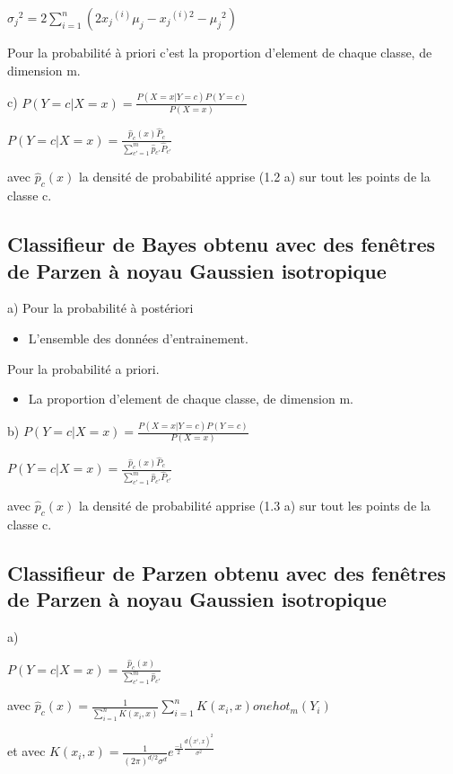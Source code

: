 \documentclass[a4paper,10pt]{article}
\begin{document}
$ {\sigma_j}^2 = 2 \sum_{i = 1}^{n}(2 {x_j}^{(i)}  \mu_j - {x_j}^{(i)2} - {\mu_j}^2)$

Pour la probabilité à priori c'est la proportion d'element de chaque classe, de dimension m.

c)
$P(Y=c | X=x)  = \frac{P(X=x | Y=c) P(Y=c)}{P(X=x)} $

$P(Y=c | X=x)  = \frac{ \hat{p}_{c}(x) \hat{P}_{c}}{ \sum_{c'=1}^{m} \hat{p}_{c'} \hat{P}_{c'} } $

avec $ \hat{p}_{c}(x) $ la densité de probabilité apprise (1.2 a) sur tout les points de la classe c.

\subsection{Classifieur de Bayes obtenu avec des fenêtres de Parzen à noyau Gaussien isotropique}

a) Pour la probabilité à postériori
\begin{itemize}
	\item L'ensemble des données d'entrainement.
\end{itemize}

Pour la probabilité a priori.
\begin{itemize}
	\item La proportion d'element de chaque classe, de dimension m.
\end{itemize}

b) $P(Y=c | X=x)  = \frac{P(X=x | Y=c) P(Y=c)}{P(X=x)} $

$P(Y=c | X=x)  = \frac{ \hat{p}_{c}(x) \hat{P}_{c}}{ \sum_{c'=1}^{m} \hat{p}_{c'} \hat{P}_{c'} } $

avec $ \hat{p}_{c}(x) $ la densité de probabilité apprise (1.3 a) sur tout les points de la classe c.


\subsection{Classifieur de Parzen obtenu avec des fenêtres de Parzen à noyau Gaussien isotropique}

a)

$P(Y=c | X=x)  = \frac{ \hat{p}_{c}(x) }{ \sum_{c'=1}^{m} \hat{p}_{c'} } $

avec $ \hat{p}_{c}(x) =  \frac{1}{ \sum_{i=1}^{n} K(x_{i}, x) } \sum_{i=1}^{n} K(x_{i}, x) onehot_{m}(Y_{i}) $

et avec $ K(x_{i}, x) = \frac{1}{ (2 \pi)^{d/2} \sigma^{d}}  e^{ \frac{-1}{2} \frac{d(x^{i},x)^{2}}{\sigma^{2}}} $ 
\end{document}
